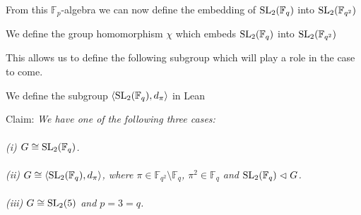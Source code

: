 From this $\mathbb{F}_p$-algebra we can now define the embedding of $\operatorname{SL}_2(\mathbb{F}_{q})$ into $\operatorname{SL}_2(\mathbb{F}_{q^2})$

\begin{definition}
    \label{SL2_monoidHom_SL2}
    \leanok
    We define the group homomorphism $\chi$ which embeds $\operatorname{SL}_2(\mathbb{F}_{q})$ into $\operatorname{SL}_2(\mathbb{F}_{q^2})$
\end{definition}


This allows us to define the following subgroup which will play a role in the case to come.

\begin{definition}
    We define the subgroup $\langle \operatorname{SL}_2(\mathbb{F}_q), d_\pi \rangle$ in Lean
\end{definition}


\begin{theorem}[Case V]
\label{case_V}
\leanok
Claim: \textit{We have one of the following three cases: \\
\\
(i) $G \cong \operatorname{SL}_2(\mathbb{F}_q)$. \\
\\
(ii) $G \cong \langle \operatorname{SL}_2(\mathbb{F}_q), d_\pi \rangle$, where $\pi \in \mathbb{F}_{q^2} \setminus \mathbb{F}_q$, $\pi^2 \in \mathbb{F}_q$ and $\operatorname{SL}_2(\mathbb{F}_q) \vartriangleleft G$. \\
\\
(iii) $G \cong \operatorname{SL}_2(5)$ and $p=3=q$.}
\end{theorem}

